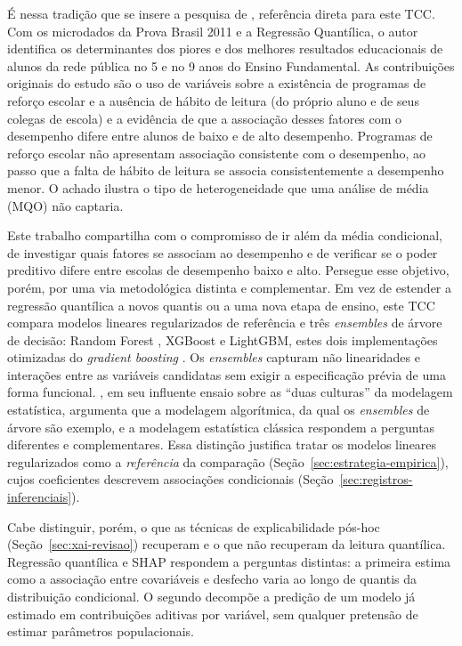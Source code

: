 É nessa tradição que se insere a pesquisa de
, referência direta para este TCC.
Com os microdados da Prova Brasil 2011 e a Regressão Quantílica, o autor
identifica os determinantes dos piores e dos melhores resultados
educacionais de alunos da rede pública no 5\textordmasculine{} e no
9\textordmasculine{} anos do Ensino Fundamental. As contribuições originais
do estudo são o uso de variáveis sobre a existência de programas de
reforço escolar e a ausência de hábito de leitura (do próprio aluno e de
seus colegas de escola) e a evidência de que a associação desses fatores
com o desempenho difere entre alunos de baixo e de alto desempenho.
Programas de reforço escolar não apresentam associação consistente com o
desempenho, ao passo que a falta de hábito de leitura se associa
consistentemente a desempenho menor. O achado ilustra o tipo de
heterogeneidade que uma análise de média (MQO) não captaria.

Este trabalho compartilha com  o
compromisso de ir além da média condicional, de investigar quais fatores
se associam ao desempenho e de verificar se o poder preditivo difere entre
escolas de desempenho baixo e alto. Persegue esse objetivo, porém, por uma
via metodológica distinta e complementar. Em vez de estender a regressão
quantílica a novos quantis ou a uma nova etapa de ensino, este TCC compara
modelos lineares regularizados de referência e três \textit{ensembles} de
árvore de decisão: Random Forest \cite{breiman2001random}, XGBoost e
LightGBM, estes dois implementações otimizadas do \textit{gradient
boosting} \cite{friedman2001greedy}. Os \textit{ensembles} capturam não
linearidades e interações entre as variáveis candidatas sem exigir a
especificação prévia de uma forma funcional. ,
em seu influente ensaio sobre as ``duas culturas'' da modelagem
estatística, argumenta que a modelagem algorítmica, da qual os
\textit{ensembles} de árvore são exemplo, e a modelagem estatística
clássica respondem a perguntas diferentes e complementares. Essa distinção
justifica tratar os modelos lineares regularizados como a
\emph{referência} da comparação (Seção~\ref{sec:estrategia-empirica}),
cujos coeficientes descrevem associações condicionais
(Seção~\ref{sec:registros-inferenciais}).

Cabe distinguir, porém, o que as técnicas de explicabilidade pós-hoc
(Seção~\ref{sec:xai-revisao}) recuperam e o que não recuperam da leitura
quantílica. Regressão quantílica e SHAP respondem a perguntas distintas: a
primeira estima como a associação entre covariáveis e desfecho varia ao
longo de quantis da distribuição condicional. O segundo decompõe a predição
de um modelo já estimado em contribuições aditivas por variável, sem
qualquer pretensão de estimar parâmetros populacionais. 

